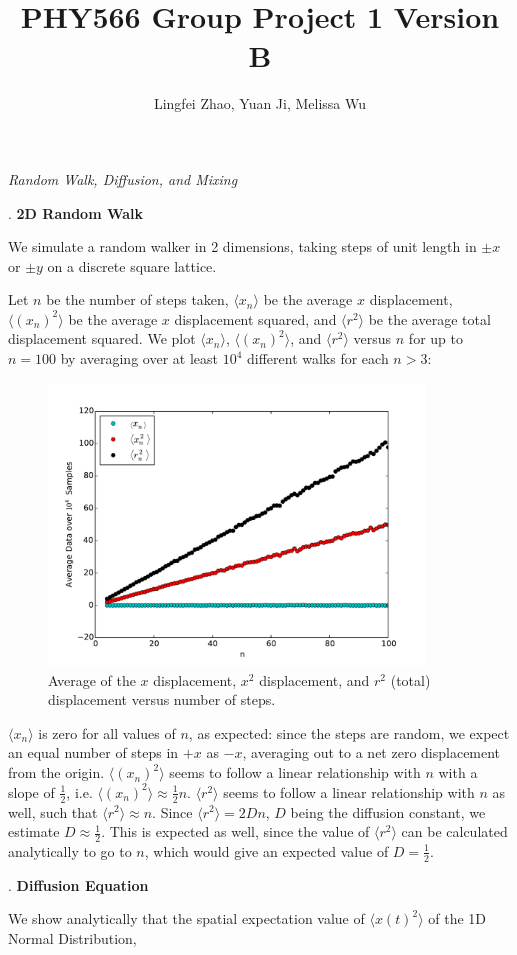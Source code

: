 \documentclass{article}
\begin{document}
\title{PHY566 Group Project 1 Version B}
\author{Lingfei Zhao, Yuan Ji, Melissa Wu}
\maketitle

\begin{center}
\textit{\large Random Walk, Diffusion, and Mixing}\par
\end{center}
. \textbf{2D Random Walk}\par
\smallskip
We simulate a random walker in 2 dimensions, taking steps of unit length in $\pm x$ or $\pm y$ on a discrete square lattice.\par
Let $n$ be the number of steps taken, $\langle x_{n} \rangle$ be the average $x$ displacement, $\langle (x_{n})^{2} \rangle$ be the average $x$ displacement squared, and $\langle r^{2} \rangle$ be the average total displacement squared. We plot $\langle x_{n} \rangle$, $\langle (x_{n})^{2} \rangle$, and $\langle r^{2} \rangle$ versus $n$ for up to $n = 100$ by averaging over at least $10^{4}$ different walks for each $n > 3$:\par
\begin{figure}[H]
\centering
\includegraphics[width=10cm]{figures/average.pdf}
\caption{Average of the $x$ displacement, $x^{2}$ displacement, and $r^{2}$ (total) displacement versus number of steps.}
\end{figure}
$\langle x_{n} \rangle$ is zero for all values of $n$, as expected: since the steps are random, we expect an equal number of steps in $+x$ as $-x$, averaging out to a net zero displacement from the origin. $\langle(x_{n})^{2} \rangle$ seems to follow a linear relationship with $n$ with a slope of $\frac{1}{2}$, i.e. $\langle(x_{n})^{2} \rangle \approx \frac{1}{2}n$. $\langle r^{2} \rangle$ seems to follow a linear relationship with $n$ as well, such that $\langle r^{2} \rangle \approx n$. Since $\langle r^{2} \rangle = 2Dn$, $D$ being the diffusion constant, we estimate $D \approx \frac{1}{2}$. This is expected as well, since the value of $\langle r^{2} \rangle$ can be calculated analytically to go to $n$, which would give an expected value of $D = \frac{1}{2}$.\par
\bigskip
{}. \textbf{Diffusion Equation}\par
\smallskip
We show analytically that the spatial expectation value of $\langle x(t)^{2} \rangle$ of the 1D Normal Distribution,
\end{document}
